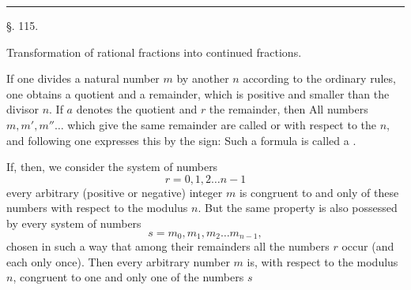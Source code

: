 
\begin{center}
\end{center}

\begin{center}
\end{center}

\begin{center}
\rule{3cm}{0.4pt}
\end{center}

\begin{center}
§. 115.
\end{center}

\begin{center}
Transformation of rational fractions into continued fractions.
\end{center}

If one divides a natural number $m$ by another $n$ according to the ordinary rules, one obtains a quotient and a remainder, which is positive and smaller than the divisor $n$. If $a$ denotes the quotient and $r$ the remainder, then
All numbers $m, m', m''\ldots$ which give the same remainder are called  or  with respect to the  $n$, and following  one expresses this by the sign:
Such a formula is called a .

If, then, we consider the system of numbers
\[
r = 0, 1, 2 \ldots n - 1
\]
every arbitrary (positive or negative) integer $m$ is congruent to  and only  of these numbers with respect to the modulus $n$. But the same property is also possessed by every system of numbers
\[
s = m_0, m_1, m_2 \ldots m_{n-1},
\]
chosen in such a way that among their remainders all the numbers $r$ occur (and each only once). Then every arbitrary number $m$ is, with respect to the modulus $n$, congruent to one and only one of the numbers $s$
